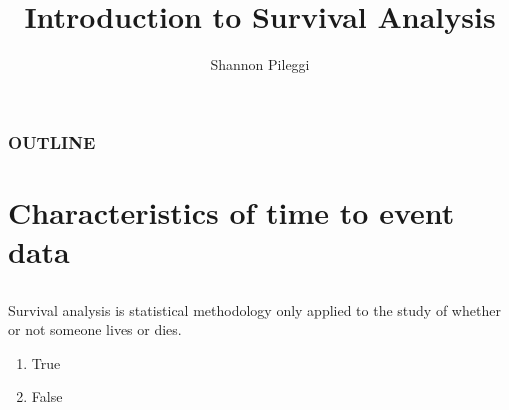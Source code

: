 



\title[Set 1]{Introduction to Survival Analysis}
\author[Pileggi]{Shannon Pileggi}


\date{}




\begin{frame}
\titlepage
\end{frame}

\begin{frame}
\frametitle{OUTLINE\qquad\qquad\qquad} \tableofcontents[hideallsubsections]
\end{frame}


\section[Time to event data]{Characteristics of time to event data}

\subsection{}

\begin{frame}
\frametitle{\grp}
\begin{clicker}{Survival analysis is statistical methodology only applied to the study of whether or not someone lives or dies.}
\begin{enumerate}
\item True
\item False
\end{enumerate}
\end{clicker}
\end{frame}

